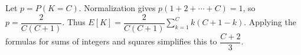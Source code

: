Let $p=P(K=C)$. Normalization gives $p(1+2+\cdots+C)=1$, so $p=\dfrac{2}{C(C+1)}$. Thus $E[K]=\dfrac{2}{C(C+1)}\sum_{k=1}^{C}k(C+1-k)$. Applying the formulas for sums of integers and squares simplifies this to $\boxed{\dfrac{C+2}{3}}$.
